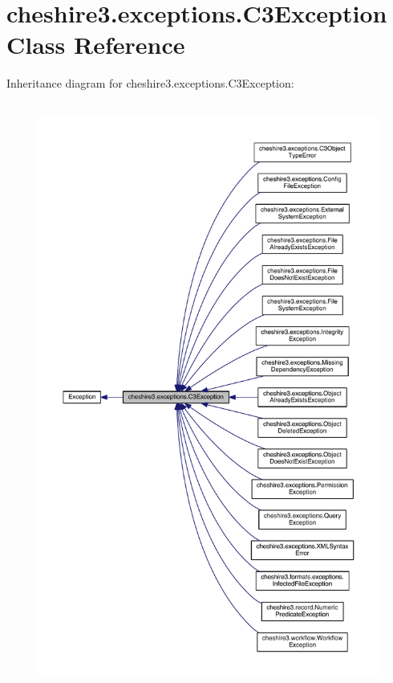 \hypertarget{classcheshire3_1_1exceptions_1_1_c3_exception}{\section{cheshire3.\-exceptions.\-C3\-Exception Class Reference}
\label{classcheshire3_1_1exceptions_1_1_c3_exception}
}


Inheritance diagram for cheshire3.\-exceptions.\-C3\-Exception\-:
\nopagebreak
\begin{figure}[H]
\begin{center}
\leavevmode
\includegraphics[height=550pt]{classcheshire3_1_1exceptions_1_1_c3_exception__inherit__graph}
\end{center}
\end{figure}


